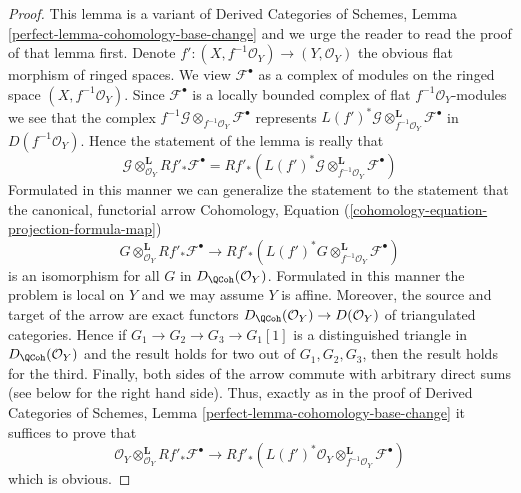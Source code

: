 \begin{proof}
This lemma is a variant of
Derived Categories of Schemes, Lemma
\ref{perfect-lemma-cohomology-base-change}
and we urge the reader to read the proof of that lemma first.
Denote $f' : (X, f^{-1}\mathcal{O}_Y) \to (Y, \mathcal{O}_Y)$
the obvious flat morphism of ringed spaces.
We view $\mathcal{F}^\bullet$ as a complex of modules on the ringed space
$(X, f^{-1}\mathcal{O}_Y)$. Since $\mathcal{F}^\bullet$ is
a locally bounded complex of flat $f^{-1}\mathcal{O}_Y$-modules
we see that the complex
$f^{-1}\mathcal{G} \otimes_{f^{-1}\mathcal{O}_Y} \mathcal{F}^\bullet$
represents $L(f')^*\mathcal{G}
\otimes_{f^{-1}\mathcal{O}_Y}^\mathbf{L}
\mathcal{F}^\bullet$ in $D(f^{-1}\mathcal{O}_Y)$. Hence the
statement of the lemma is really that
$$
\mathcal{G} \otimes_{\mathcal{O}_Y}^\mathbf{L} Rf'_*\mathcal{F}^\bullet =
Rf'_*(L(f')^*\mathcal{G}
\otimes_{f^{-1}\mathcal{O}_Y}^\mathbf{L}
\mathcal{F}^\bullet)
$$
Formulated in this manner we can generalize the statement to
the statement that the canonical, functorial arrow
Cohomology, Equation (\ref{cohomology-equation-projection-formula-map})
$$
G \otimes_{\mathcal{O}_Y}^\mathbf{L} Rf'_*\mathcal{F}^\bullet
\longrightarrow
Rf'_*(L(f')^*G \otimes_{f^{-1}\mathcal{O}_Y}^\mathbf{L} \mathcal{F}^\bullet)
$$
is an isomorphism for all $G$ in $D_\QCoh(\mathcal{O}_Y)$.
Formulated in this manner the problem is
local on $Y$ and we may assume $Y$ is affine. Moreover, the source and
target of the arrow are exact functors
$D_\QCoh(\mathcal{O}_Y) \to D(\mathcal{O}_Y)$
of triangulated categories. Hence if $G_1 \to G_2 \to G_3 \to G_1[1]$
is a distinguished triangle in $D_\QCoh(\mathcal{O}_Y)$ and the
result holds for two out of $G_1, G_2, G_3$, then the result
holds for the third. Finally, both sides of the arrow
commute with arbitrary direct sums (see below for the right hand side).
Thus, exactly as in the proof of Derived Categories of Schemes, Lemma
\ref{perfect-lemma-cohomology-base-change} it suffices to prove that
$$
\mathcal{O}_Y \otimes_{\mathcal{O}_Y}^\mathbf{L} Rf'_*\mathcal{F}^\bullet
\longrightarrow
Rf'_*(L(f')^*\mathcal{O}_Y
\otimes_{f^{-1}\mathcal{O}_Y}^\mathbf{L} \mathcal{F}^\bullet)
$$
which is obvious.


\end{proof}
